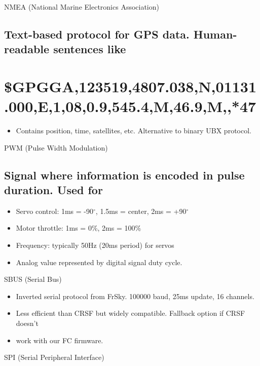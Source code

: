 \documentclass[11pt,letterpaper]{article}
\begin{document}
NMEA (National Marine Electronics Association)\par

\subsection{Text-based protocol for GPS data. Human-readable sentences like}

\section{\$GPGGA,123519,4807.038,N,01131.000,E,1,08,0.9,545.4,M,46.9,M,,*47}

\begin{itemize}
  \item Contains position, time, satellites, etc. Alternative to binary UBX protocol.
\end{itemize}

PWM (Pulse Width Modulation)\par

\subsection{Signal where information is encoded in pulse duration. Used for}

\begin{itemize}
  \item Servo control: 1ms = -90$^\circ$, 1.5ms = center, 2ms = +90$^\circ$
  \item Motor throttle: 1ms = 0\%, 2ms = 100\%
  \item Frequency: typically 50Hz (20ms period) for servos
  \item Analog value represented by digital signal duty cycle.
\end{itemize}

SBUS (Serial Bus)\par

\begin{itemize}
  \item Inverted serial protocol from FrSky. 100000 baud, 25ms update, 16 channels.
  \item Less efficient than CRSF but widely compatible. Fallback option if CRSF doesn't
  \item work with our FC firmware.
\end{itemize}

SPI (Serial Peripheral Interface)\par
\end{document}
